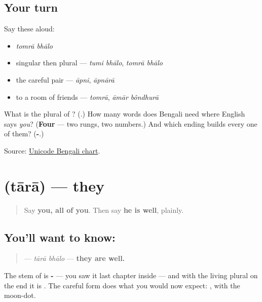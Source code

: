 \subsection*{Your turn}
Say these aloud:

\begin{itemize}
\raggedright
  \item \emph{tomrā bhālo}
  \item singular then plural — \emph{tumi bhālo}, \emph{tomrā bhālo}
  \item the careful pair — \emph{āpni}, \emph{āpnārā}
  \item to a room of friends — \emph{tomrā}, \emph{āmār bôndhurā}
\end{itemize}

\begin{tcolorbox}[breakable,colback=teal!4,colframe=teal!35!black,title={Before you move on}]
What is the plural of \textbf{}? (\textbf{}.) How many words does Bengali need where English says \emph{you}? (\textbf{Four} — two rungs, two numbers.) And which ending builds every one of them? (\textbf{-}.)

Source: \href{https://www.unicode.org/charts/PDF/U0980.pdf}{Unicode Bengali chart}.
\end{tcolorbox}
\section[\texorpdfstring{\bn{তারা} (tārā)}{তারা (tārā)}]{ (tārā) — they}

\label{lesson:BN-C24-tara}



\begin{quote}
Say \textbf{you, all of you}. Then say \textbf{he is well}, plainly.
\end{quote}

\subsection*{You'll want to know: }
\begin{quote}
\textbf{ } — \emph{tārā bhālo} — \textbf{they are well.}
\end{quote}

The stem of \textbf{} is \textbf{-} — you saw it last chapter inside \textbf{} — and with the living plural on the end it is \textbf{}. The careful form does what you would now expect: \textbf{}, with the moon-dot.

